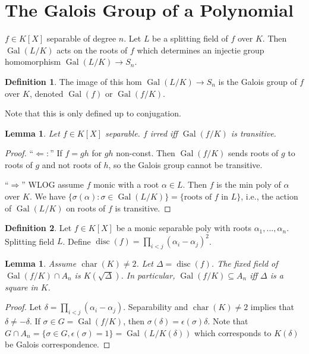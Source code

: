 \documentclass{article}
\theoremstyle{definition}
\newtheorem*{defn*}{Definition}
\theoremstyle{remark}
\theoremstyle{plain}
\newtheorem{lem}[defn]{Lemma}
\newcommand{\Gal}{\operatorname{Gal}}
\begin{document}
\section{The Galois Group of a Polynomial}
$f\in K[X]$ separable of degree $n$. Let $L$ be a splitting field of $f$ over $K$. Then $\Gal(L/K)$ acts on the roots of $f$ which determines an injectie group homomorphism $\Gal(L/K)\to S_n$.
\begin{defn*}
    The image of this hom $\Gal(L/K)\to S_n$ is the Galois group of $f$ over $K$, denoted $\Gal(f)$ or $\Gal(f/K)$.
\end{defn*}
Note that this is only defined up to conjugation.
\begin{lem}
    Let $f\in K[X]$ separable. $f$ irred iff $\Gal(f/K)$ is transitive.
\end{lem}
\begin{proof}
    ``$\Leftarrow:$'' If $f=gh$ for $gh$ non-const. Then $\Gal(f/K)$ sends roots of $g$ to roots of $g$ and not roots of $h$, so the Galois group cannot be transitive.

    ``$\Rightarrow$'' WLOG assume $f$ monic with a root $\alpha\in L$. Then $f$ is the min poly of $\alpha$ over $K$. We have 
    $\{\sigma(\alpha):\sigma\in\Gal(L/K)\}=\{\text{roots of }f\text{ in }L\}$, i.e., the action of $\Gal(L/K)$ on roots of $f$ is transitive.
\end{proof}
\newcommand{\disc}{\operatorname{disc}}
\begin{defn*}
    Let $f\in K[X]$ be a monic separable poly with roots $\alpha_1,...,\alpha_n$. Splitting field $L$. Define $\disc(f)=\prod_{i<j}(\alpha_i-\alpha_j)^2$.
\end{defn*}
\begin{lem}
    Assume $\operatorname{char}(K)\neq 2$. Let $\Delta=\disc(f)$. The fixed field of $\Gal(f/K)\cap A_n$ is $K(\sqrt\Delta)$. In particular, $\Gal(f/K)\subseteq A_n$ iff $\Delta$ is a square in $K$.
\end{lem}
\begin{proof}
    Let $\delta=\prod_{i<j}(\alpha_i-\alpha_j)$. Separability and $\operatorname{char}(K)\neq 2$ implies that $\delta\neq -\delta$. If $\sigma\in G=\Gal(f/K)$, then $\sigma(\delta)=\epsilon(\sigma)\delta$. Note that $G\cap A_n=\{\sigma\in G,\epsilon(\sigma)=1\}=\Gal(L/K(\delta))$ which corresponds to $K(\delta)$ be Galois correspondence.
\end{proof}
\end{document}
